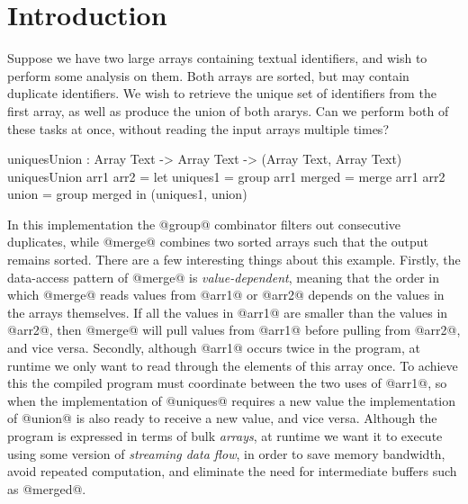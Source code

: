 \section{Introduction}
\label{s:Introduction}


Suppose we have two large arrays containing textual identifiers, and wish to perform some analysis on them. Both arrays are sorted, but may contain duplicate identifiers. 
We wish to retrieve the unique set of identifiers from the first array, as well as produce the union of both ararys. Can we perform both of these tasks at once, without reading the input arrays multiple times?
\begin{code}
  uniquesUnion : Array Text -> Array Text -> (Array Text, Array Text)
  uniquesUnion arr1 arr2
   = let  uniques1 = group arr1
          merged   = merge arr1 arr2
          union    = group merged
     in   (uniques1, union)
\end{code}



In this implementation the @group@ combinator filters out consecutive duplicates, while @merge@ combines two sorted arrays such that the output remains sorted. There are a few interesting things about this example. 
Firstly, the data-access pattern of @merge@ is \emph{value-dependent}, meaning that the order in which @merge@ reads values from @arr1@ or @arr2@ depends on the values in the arrays themselves. If all the values in @arr1@ are smaller than the values in @arr2@, then @merge@ will pull values from @arr1@ before pulling from @arr2@, and vice versa.
Secondly, although @arr1@ occurs twice in the program, at runtime we only want to read through the elements of this array once. To achieve this the compiled program must coordinate between the two uses of @arr1@, so when the implementation of @uniques@ requires a new value the implementation of @union@ is also ready to receive a new value, and vice versa.
Although the program is expressed in terms of bulk \emph{arrays}, at runtime we want it to execute using some version of \emph{streaming data flow}, in order to save memory bandwidth, avoid repeated computation, and eliminate the need for intermediate buffers such as @merged@.


